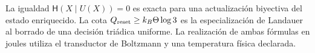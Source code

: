 \begin{statusbox}[title={Alcance del Landauer nulo}]
La igualdad \(\mathsf H(X\mid U(X))=0\) es exacta para una actualización
biyectiva del estado enriquecido. La cota
\(Q_{\rm reset}\ge k_B\Theta\log3\) es la especialización de Landauer al
borrado de una decisión triádica uniforme. La realización de ambas fórmulas
en joules utiliza el transductor de Boltzmann y una temperatura física
declarada.
\end{statusbox}
